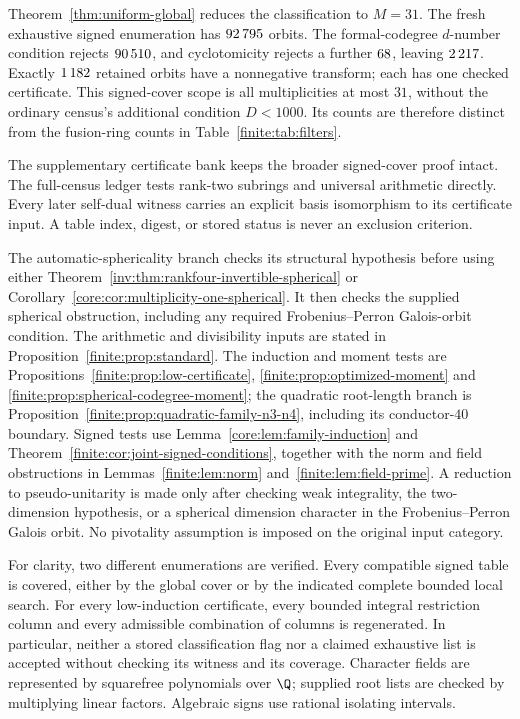 Theorem~\ref{thm:uniform-global} reduces the classification to $M=31$.
The fresh exhaustive signed enumeration has $92\,795$ orbits.
The formal-codegree $d$-number condition rejects $90\,510$,
and cyclotomicity rejects a further $68$, leaving
$2\,217$. Exactly $1\,182$ retained orbits
have a nonnegative transform; each has one checked certificate. This
signed-cover scope is all multiplicities at most $31$, without the ordinary
census's additional condition $D<1000$. Its counts are therefore distinct
from the fusion-ring counts in Table~\ref{finite:tab:filters}.

The supplementary certificate bank keeps the broader signed-cover proof
intact. The full-census ledger tests rank-two subrings and universal
arithmetic directly. Every later self-dual witness carries an explicit basis
isomorphism to its certificate input. A table index, digest, or stored status
is never an exclusion criterion.

The automatic-sphericality branch checks its structural hypothesis
before using either Theorem~\ref{inv:thm:rankfour-invertible-spherical}
or Corollary~\ref{core:cor:multiplicity-one-spherical}. It then checks
the supplied spherical obstruction, including any required
Frobenius--Perron Galois-orbit condition.
The arithmetic and divisibility inputs are stated in
Proposition~\ref{finite:prop:standard}.  The induction and moment tests
are Propositions~\ref{finite:prop:low-certificate},
\ref{finite:prop:optimized-moment} and
\ref{finite:prop:spherical-codegree-moment}; the quadratic root-length
branch is Proposition~\ref{finite:prop:quadratic-family-n3-n4}, including
its conductor-$40$ boundary.  Signed tests use
Lemma~\ref{core:lem:family-induction} and
Theorem~\ref{finite:cor:joint-signed-conditions}, together with the norm and
field obstructions in Lemmas~\ref{finite:lem:norm}
and~\ref{finite:lem:field-prime}.
A reduction to pseudo-unitarity is made only after checking weak
integrality, the two-dimension hypothesis, or a spherical dimension
character in the Frobenius--Perron Galois orbit.  No pivotality assumption
is imposed on the original input category.

For clarity, two different enumerations are verified.  Every compatible
signed table is covered, either by the global cover or by the indicated
complete bounded local search.  For every low-induction certificate,
every bounded integral restriction column and every admissible combination
of columns is regenerated.  In particular, neither a stored classification
flag nor a claimed exhaustive list is accepted without checking its witness
and its coverage.  Character fields are represented by squarefree
polynomials over $\Q$; supplied root lists are checked by multiplying
linear factors.  Algebraic signs use rational isolating intervals.

